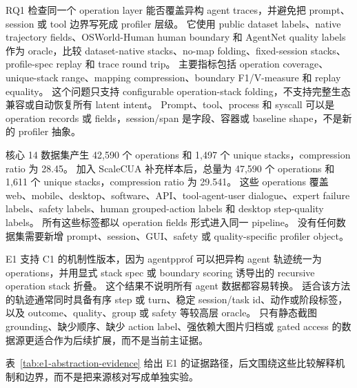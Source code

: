 \documentclass[10pt,twocolumn]{ctexart}
\newcommand{\toolname}{agentpprof}
\begin{document}
RQ1 检查同一个 operation layer 能否覆盖异构 agent traces，并避免把 prompt、session 或 tool 边界写死成 profiler 层级。
它使用 public dataset labels、native trajectory fields、OSWorld-Human human boundary 和 AgentNet quality labels 作为 oracle，比较 dataset-native stacks、no-map folding、fixed-session stacks、profile-spec replay 和 trace round trip。
主要指标包括 operation coverage、unique-stack range、mapping compression、boundary F1/V-measure 和 replay equality。
这个问题只支持 configurable operation-stack folding，不支持完整生态兼容或自动恢复所有 latent intent。
Prompt、tool、process 和 syscall 可以是 operation records 或 fields，session/span 是字段、容器或 baseline shape，不是新的 profiler 抽象。

核心 14 数据集产生 42,590 个 operations 和 1,497 个 unique stacks，compression ratio 为 28.45。
加入 ScaleCUA 补充样本后，总量为 47,590 个 operations 和 1,611 个 unique stacks，compression ratio 为 29.541。
这些 operations 覆盖 web、mobile、desktop、software、API、tool-agent-user dialogue、expert failure labels、safety labels、human grouped-action labels 和 desktop step-quality labels。
所有这些标签都以 operation fields 形式进入同一 pipeline。
没有任何数据集需要新增 prompt、session、GUI、safety 或 quality-specific profiler object。

E1 支持 C1 的机制性版本，因为 \toolname{} 可以把异构 agent 轨迹统一为 operations，并用显式 stack spec 或 boundary scoring 诱导出的 recursive operation stack 折叠。
这个结果不说明所有 agent 数据都容易转换。
适合该方法的轨迹通常同时具备有序 step 或 turn、稳定 session/task id、动作或阶段标签，以及 outcome、quality、group 或 safety 等较高层 oracle。
只有静态截图 grounding、缺少顺序、缺少 action label、强依赖大图片归档或 gated access 的数据源更适合作为后续扩展，而不是当前主证据。

表~\ref{tab:e1-abstraction-evidence} 给出 E1 的证据路径，后文围绕这些比较解释机制和边界，而不是把来源核对写成单独实验。
\end{document}
